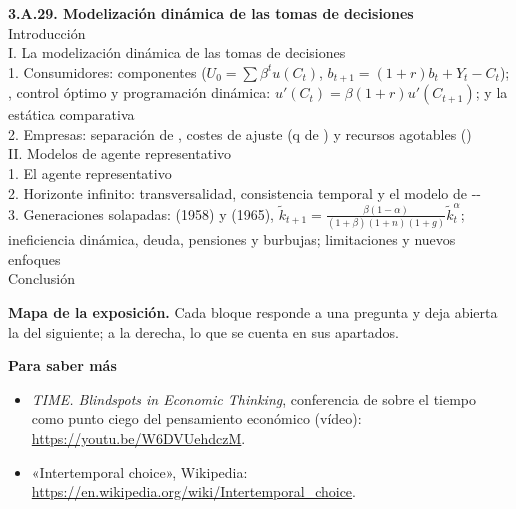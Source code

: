 \documentclass[11pt]{article}
\begin{document}
\begin{esquema}
\textbf{3.A.29. Modelización dinámica de las tomas de decisiones}\\[2pt]
Introducción\\
I. La modelización dinámica de las tomas de decisiones\\
\hspace*{1.5em}1. Consumidores: componentes ($U_0=\sum\beta^tu(C_t)$, $b_{t+1}=(1+r)b_t+Y_t-C_t$); , control óptimo y programación dinámica: $u'(C_t)=\beta(1+r)u'(C_{t+1})$;  y la estática comparativa\\
\hspace*{1.5em}2. Empresas: separación de , costes de ajuste (q de ) y recursos agotables ()\\
II. Modelos de agente representativo\\
\hspace*{1.5em}1. El agente representativo\\
\hspace*{1.5em}2. Horizonte infinito: transversalidad, consistencia temporal y el modelo de --\\
\hspace*{1.5em}3. Generaciones solapadas:  (1958) y  (1965), $\tilde k_{t+1}=\frac{\beta(1-\alpha)}{(1+\beta)(1+n)(1+g)}\tilde k_t^{\alpha}$; ineficiencia dinámica, deuda, pensiones y burbujas; limitaciones y nuevos enfoques\\
Conclusión
\end{esquema}

\begin{anotaciones}
\textbf{Mapa de la exposición.} Cada bloque responde a una pregunta y deja abierta la del siguiente; a la derecha, lo que se cuenta en sus apartados.
\begin{infografiacaja}
\caption{Mapa de la exposición: la pregunta de cada bloque y el hilo que los une}\label{figu:mapa-tema}
\end{infografiacaja}
\end{anotaciones}


\begin{anotaciones}
\textbf{Para saber más}
\begin{itemize}
\item \emph{TIME. Blindspots in Economic Thinking}, conferencia de  sobre el tiempo como punto ciego del pensamiento económico (vídeo): \url{https://youtu.be/W6DVUehdczM}\nocite{YSI2026Fonseca}.
\item «Intertemporal choice», Wikipedia: \url{https://en.wikipedia.org/wiki/Intertemporal_choice}\nocite{Wikipedia2026Intertemporal}.
\end{itemize}
\end{anotaciones}
\end{document}
